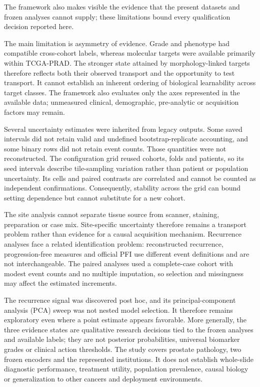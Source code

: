 The framework also makes visible the evidence that the present datasets and frozen analyses
cannot supply; these limitations bound every qualification decision reported here.

The main limitation is asymmetry of evidence. Grade and phenotype had compatible
cross-cohort labels, whereas molecular targets were available primarily within TCGA-PRAD.
The stronger state attained by morphology-linked targets therefore reflects both their
observed transport and the opportunity to test transport. It cannot establish an inherent
ordering of biological learnability across target classes. The framework also evaluates
only the axes represented in the available data; unmeasured clinical, demographic,
pre-analytic or acquisition factors may remain.

Several uncertainty estimates were inherited from legacy outputs. Some saved intervals did
not retain valid and undefined bootstrap-replicate accounting, and some binary rows did not
retain event counts. Those quantities were not reconstructed. The configuration grid reused
cohorts, folds and patients, so its seed intervals describe tile-sampling variation rather
than patient or population uncertainty. Its cells and paired contrasts are correlated and
cannot be counted as independent confirmations. Consequently, stability across the grid can
bound setting dependence but cannot substitute for a new cohort.

The site analysis cannot separate tissue source from scanner, staining, preparation or case
mix. Site-specific uncertainty therefore remains a transport problem rather than evidence
for a causal acquisition mechanism. Recurrence analyses face a related identification
problem: reconstructed recurrence, progression-free measures and official PFI use different
event definitions and are not interchangeable. The paired analyses used a complete-case
cohort with modest event counts and no multiple imputation, so selection and missingness may
affect the estimated increments.

The recurrence signal was discovered post hoc, and its principal-component analysis (PCA)
sweep was not nested model selection. It therefore remains exploratory even where a point
estimate appears favorable.
More generally, the three evidence states are qualitative research decisions tied to the
frozen analyses and available labels; they are not posterior probabilities, universal
biomarker grades or clinical action thresholds. The study covers prostate pathology, two
frozen encoders and the represented institutions. It does not establish whole-slide
diagnostic performance, treatment utility, population prevalence, causal biology or
generalization to other cancers and deployment environments.

